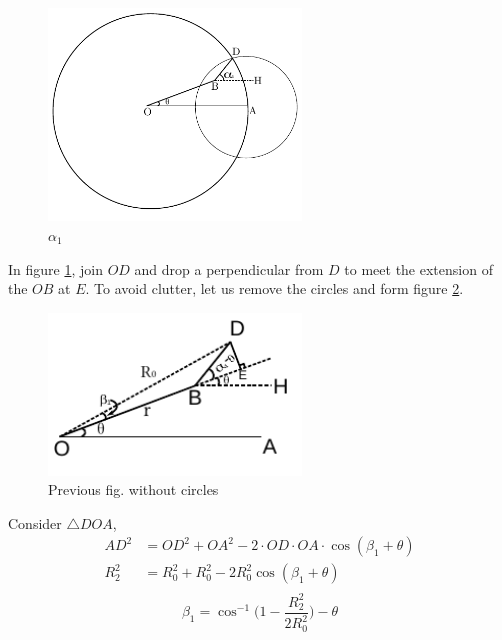 \begin{figure}[h]
\centering \vspace{-0.1in}
\includegraphics[width=0.6\textwidth]{images/geo3.pdf}
\vspace{-20pt} \caption[$\alpha_1$]{\small $\alpha_1$}
\label{fig:alpha1}
\end{figure} 
\newpage
In figure \ref{fig:alpha1}, join $OD$ and drop
a perpendicular from $D$ to meet the extension of the $OB$ at $E$. To avoid clutter, let us 
remove the circles and form figure \ref{fig:alpha11}. 
\begin{figure}[h]
\centering \vspace{-0.1in}
\includegraphics[width=0.6\textwidth]{images/geo4.pdf}
\vspace{-20pt} \caption[Previous fig. without circles]{\small Previous fig. without circles}
\label{fig:alpha11}
\end{figure}
Consider $\bigtriangleup DOA$, 
\begin{align*}
	AD^2 &= OD^2 + OA^2 - 2 \cdot OD \cdot OA \cdot \cos(\beta_1+\theta) \\
	R_2^2 &= R_0^2 + R_0^2 - 2R_0^2\cos(\beta_1 + \theta)\\
\end{align*}
\begin{equation}\label{eq:beta1}
	\beta_1 = \cos^{-1}\bigg(1-\frac{R_2^2}{2R_0^2}\bigg) - \theta
\end{equation}
